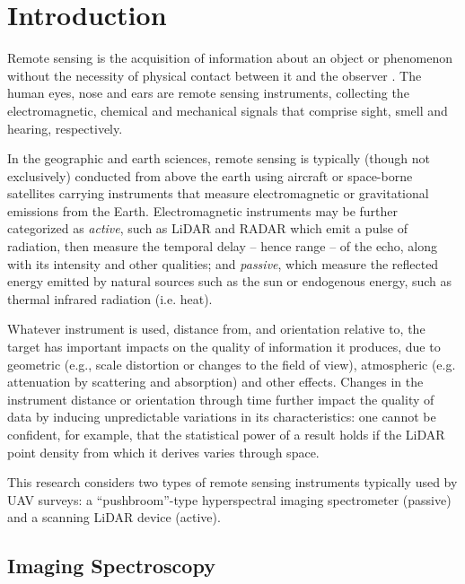 \label{chapter:lit_review}

\newlength{\savedunitlength}
\setlength{\unitlength}{2em}

\section{Introduction}

Remote sensing is the acquisition of information about an object or phenomenon without the necessity of physical contact between it and the observer \cite{Gupta2018}. The human eyes, nose and ears are remote sensing instruments, collecting the electromagnetic, chemical and mechanical signals that comprise sight, smell and hearing, respectively.

In the geographic and earth sciences, remote sensing is typically (though not exclusively) conducted from above the earth using aircraft or space-borne satellites carrying instruments that measure electromagnetic or gravitational emissions from the Earth. Electromagnetic instruments may be further categorized as \emph{active}, such as LiDAR and RADAR which emit a pulse of radiation, then measure the temporal delay -- hence range -- of the echo, along with its intensity and other qualities; and \emph{passive}, which measure the reflected energy emitted by natural sources such as the sun or endogenous energy, such as thermal infrared radiation (i.e. heat).

Whatever instrument is used, distance from, and orientation relative to, the target has important impacts on the quality of information it produces, due to geometric (e.g., scale distortion or changes to the field of view), atmospheric (e.g. attenuation by scattering and absorption) and other effects. Changes in the instrument distance or orientation through time further impact the quality of data by inducing unpredictable variations in its characteristics: one cannot be confident, for example, that the statistical power of a result holds if the LiDAR point density from which it derives varies through space.

This research considers two types of remote sensing instruments typically used by UAV surveys: a ``pushbroom''-type hyperspectral imaging spectrometer (passive) and a scanning LiDAR device (active). 


\subsection{Imaging Spectroscopy}


